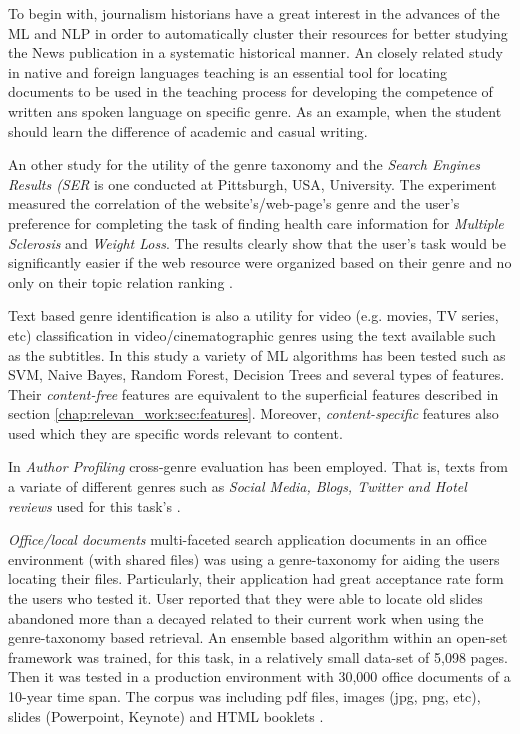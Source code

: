 To begin with,  journalism historians have a great interest in the advances of the ML and NLP in order to automatically cluster their resources for better studying the News publication in a systematic historical manner. An closely related study in native and foreign languages teaching is an essential tool for locating documents to be used in the teaching process for developing the competence of written ans spoken language on specific genre. As an example, when the student should learn the difference of academic and casual writing.

An other study for the utility of the genre taxonomy and the \textit{Search Engines Results (SER} is one conducted at Pittsburgh, USA, University.  The experiment measured the correlation of the website's/web-page's genre and the user's preference for completing the task of finding health care information for \textit{Multiple Sclerosis} and \textit{Weight Loss}. The results clearly show that the user's task would be significantly easier if the web resource were organized based on their genre and no only on their topic relation ranking \parencite{chi2018sources}.

Text based genre identification is also a utility for video (e.g. movies, TV series, etc) classification in video/cinematographic genres using the text available such as the subtitles. In this study a variety of ML algorithms has been tested such as SVM, Naive Bayes, Random Forest, Decision Trees and several types of features. Their \textit{content-free} features are equivalent to the superficial features described in section \ref{chap:relevan_work:sec:features}. Moreover, \textit{content-specific} features also used which they are specific words relevant to content\parencite{lee2017text}.

In \textit{Author Profiling} cross-genre evaluation has been employed. That is, texts from a variate of different genres such as \textit{Social Media, Blogs, Twitter and Hotel reviews} used for this task's  \parencite{rangel2016overview}. 

\textit{Office/local documents} multi-faceted search application documents in an office environment (with shared files) was using a genre-taxonomy for aiding the users locating their files. Particularly, their application had great acceptance rate form the users who tested it.  User reported that they were able to locate old slides abandoned more than a decayed related to their current work when using the genre-taxonomy based retrieval. An ensemble based algorithm within an open-set framework was trained, for this task, in a relatively small data-set of 5,098 pages. Then it was tested in a production environment with 30,000 office documents of a 10-year time span. The corpus was including pdf files, images (jpg, png, etc), slides (Powerpoint, Keynote) and HTML booklets \parencite{chen2012genre}.

